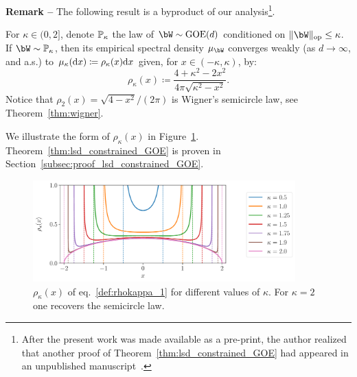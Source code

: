 \myskip
\textbf{Remark --}
The following result is a byproduct of our analysis\footnote{
After the present work was made available as a pre-print, the author realized that another proof of Theorem~\ref{thm:lsd_constrained_GOE} had appeared in an unpublished manuscript~\citep{bouali2015constrained}.
}.
\begin{theorem}\label{thm:lsd_constrained_GOE}
   For $\kappa \in (0,2]$, denote $\mathbb{P}_\kappa$ the law of $\bW \sim \GOE(d)$ conditioned on $\|\bW\|_\op \leq \kappa$. 
    If $\bW \sim \bbP_\kappa$, then its empirical spectral density $\mu_\bW$ converges weakly (as $d \to \infty$, and a.s.) to $\mu_\kappa(\mathrm{d} x) \coloneqq \rho_\kappa(x) \mathrm{d} x$ given, for $x \in (-\kappa, \kappa)$, by:
    \begin{equation}
        \label{def:rhokappa_1}
        \rho_\kappa(x) \coloneqq \frac{4+\kappa^2-2x^2}{4 \pi \sqrt{\kappa^2 - x^2}}. 
    \end{equation}
    Notice that $\rho_{2}(x) = \sqrt{4 - x^2}/(2\pi)$ is Wigner's semicircle law, see Theorem~\ref{thm:wigner}.
\end{theorem}
\noindent
We illustrate the form of $\rho_\kappa(x)$ in Figure~\ref{fig:rho_kappa}.
Theorem~\ref{thm:lsd_constrained_GOE} is proven in Section~\ref{subsec:proof_lsd_constrained_GOE}.
\begin{figure}[!t]
   \centering
\includegraphics[width=0.9\textwidth]{figures/rho_kappa.pdf}
\caption{$\rho_\kappa(x)$ of eq.~\eqref{def:rhokappa_1} for different values of $\kappa$. For $\kappa = 2$ one recovers the semicircle law.\label{fig:rho_kappa}}
\end{figure}

